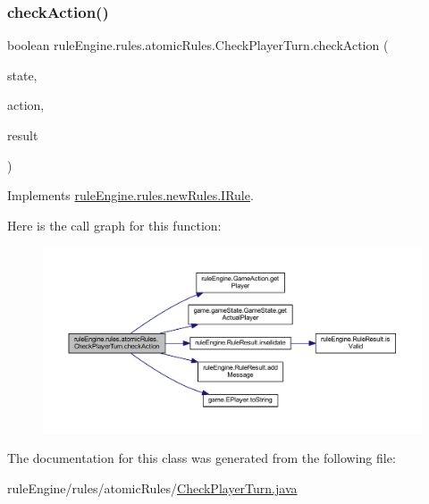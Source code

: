 \subsubsection{\texorpdfstring{check\+Action()}{checkAction()}}
{\footnotesize\ttfamily boolean rule\+Engine.\+rules.\+atomic\+Rules.\+Check\+Player\+Turn.\+check\+Action (\begin{DoxyParamCaption}\item[{\mbox{\hyperlink{classgame_1_1game_state_1_1_game_state}{Game\+State}}}]{state,  }\item[{\mbox{\hyperlink{classrule_engine_1_1_game_action}{Game\+Action}}}]{action,  }\item[{\mbox{\hyperlink{classrule_engine_1_1_rule_result}{Rule\+Result}}}]{result }\end{DoxyParamCaption})\hspace{0.3cm}{\ttfamily [inline]}}



Implements \mbox{\hyperlink{interfacerule_engine_1_1rules_1_1new_rules_1_1_i_rule_a72ce29a47d7a5fba75a09444a50a481e}{rule\+Engine.\+rules.\+new\+Rules.\+I\+Rule}}.

Here is the call graph for this function\+:
\nopagebreak
\begin{figure}[H]
\begin{center}
\leavevmode
\includegraphics[width=350pt]{classrule_engine_1_1rules_1_1atomic_rules_1_1_check_player_turn_a451c627cc11c06a071c96c7d784836ec_cgraph}
\end{center}
\end{figure}


The documentation for this class was generated from the following file\+:\begin{DoxyCompactItemize}
\item 
rule\+Engine/rules/atomic\+Rules/\mbox{\hyperlink{_check_player_turn_8java}{Check\+Player\+Turn.\+java}}\end{DoxyCompactItemize}
